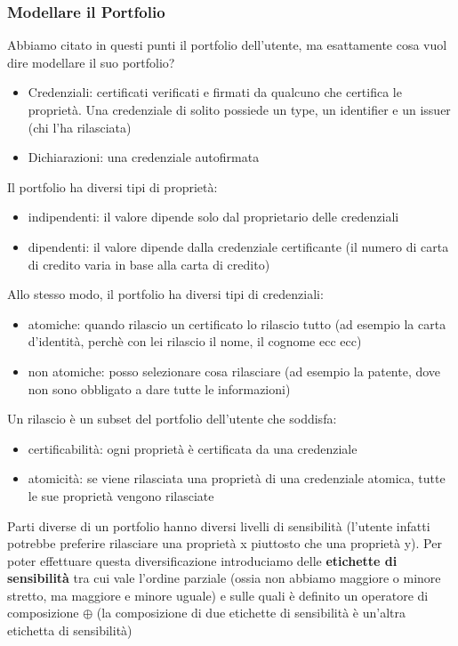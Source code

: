 \subsubsection{Modellare il Portfolio}
Abbiamo citato in questi punti il portfolio dell'utente, ma esattamente cosa vuol dire modellare il suo portfolio?
\begin{itemize}
    \item Credenziali: certificati verificati e firmati da qualcuno che certifica le proprietà. Una credenziale di solito possiede un type, un identifier e un issuer (chi l'ha rilasciata)
    \item Dichiarazioni: una credenziale autofirmata
\end{itemize}
Il portfolio ha diversi tipi di proprietà:
\begin{itemize}
    \item indipendenti: il valore dipende solo dal proprietario delle credenziali
    \item dipendenti: il valore dipende dalla credenziale certificante (il numero di carta di credito varia in base alla carta di credito)
\end{itemize}
Allo stesso modo, il portfolio ha diversi tipi di credenziali:
\begin{itemize}
    \item atomiche: quando rilascio un certificato lo rilascio tutto (ad esempio la carta d'identità, perchè con lei rilascio il nome, il cognome ecc ecc)
    \item non atomiche: posso selezionare cosa rilasciare (ad esempio la patente, dove non sono obbligato a dare tutte le informazioni)
\end{itemize}
Un rilascio è un subset del portfolio dell'utente che soddisfa:
\begin{itemize}
    \item certificabilità: ogni proprietà è certificata da una credenziale
    \item atomicità: se viene rilasciata una proprietà di una credenziale atomica, tutte le sue proprietà vengono rilasciate
\end{itemize}
Parti diverse di un portfolio hanno diversi livelli di sensibilità (l'utente infatti potrebbe preferire rilasciare una proprietà x piuttosto che una proprietà y). Per poter effettuare questa diversificazione introduciamo delle \textbf{etichette di sensibilità} tra cui vale l'ordine parziale (ossia non abbiamo maggiore o minore stretto, ma maggiore e minore uguale) e sulle quali è definito un operatore di composizione \(\oplus\) (la composizione di due etichette di sensibilità è un'altra etichetta di sensibilità)

